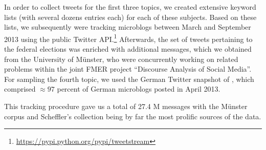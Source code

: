 In order to collect tweets for the first three topics, we created
extensive keyword lists (with several dozens entries each) for each of
these subjects.  Based on these lists, we subsequently were tracking
microblogs between March and September 2013 using the public Twitter
API.\footnote{\url{https://pypi.python.org/pypi/tweetstream}}
Afterwards, the set of tweets pertaining to the federal elections was
enriched with additional messages, which we obtained from the
University of M\"unster, who were concurrently working on related
problems within the joint FMER project ``Discourse Analysis of Social
Media''.  For sampling the fourth topic, we used the German Twitter
snapshot of \citet{Scheffler:14}, which comprised $\approx97$ percent
of German microblogs posted in April 2013.

This tracking procedure gave us a total of 27.4 M messages with the
M\"unster corpus and Scheffler's collection being by far the most
prolific sources of the data.






